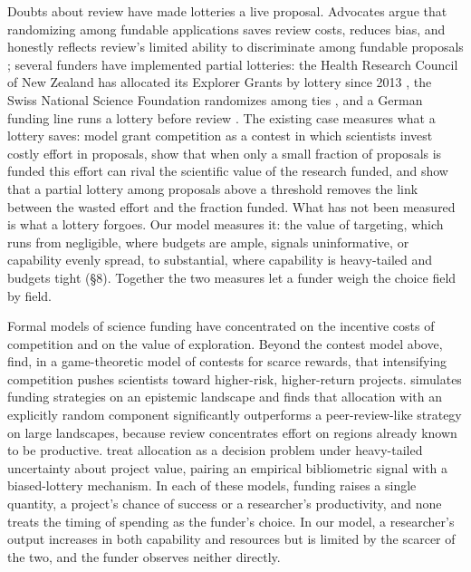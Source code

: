 \documentclass[article, 11pt, reqno]{amsart}
\theoremstyle{named}
\begin{document}
Doubts about review have made lotteries a live proposal. Advocates argue that randomizing
among fundable applications saves review costs, reduces bias, and honestly reflects
review's limited ability to discriminate among fundable proposals
\citep{FangCasadevall2016, Avin2019, Roumbanis2019}; several funders have implemented
partial lotteries: the Health Research Council of New Zealand has allocated its Explorer
Grants by lottery since 2013 \citep{Liu2020}, the Swiss National Science Foundation
randomizes among ties \citep{Heyard2022}, and a German funding line runs a lottery before
review \citep{Luebber2025}.
The existing case measures what a lottery saves: \citet{GrossBergstrom2019} model grant
competition as a contest in which scientists invest costly effort in proposals, show that
when only a small fraction of proposals is funded this effort can rival the scientific
value of the research funded, and show that a partial lottery among proposals above a
threshold removes the link between the wasted effort and the fraction funded. What has not
been measured is what a lottery forgoes. Our model measures it: the value of targeting,
which runs from negligible, where budgets are ample,
signals uninformative, or capability evenly spread, to substantial, where capability is
heavy-tailed and budgets tight (\S8). Together the two measures let a funder weigh the
choice field by field.

Formal models of science funding have concentrated on the incentive costs of competition
and on the value of exploration. Beyond the contest model above, \citet{GrossBergstrom2025}
find, in a game-theoretic model of contests for scarce rewards, that intensifying
competition pushes scientists toward higher-risk, higher-return projects.
\citet{AvinBJPS2019}
simulates funding strategies on an epistemic landscape and finds that allocation with an
explicitly random component significantly outperforms a peer-review-like strategy on large
landscapes, because review concentrates effort on regions already known to be productive.
\citet{Sorzano2026} treat allocation as a decision problem under heavy-tailed uncertainty
about project value, pairing an empirical bibliometric signal with a biased-lottery
mechanism. In each of these models, funding raises a single quantity, a project's
chance of success or a researcher's productivity, and none treats the timing of spending as
the funder's choice.
In our model, a researcher's output increases in both capability and resources but is
limited by the scarcer of the two, and the funder observes neither directly.
\end{document}
